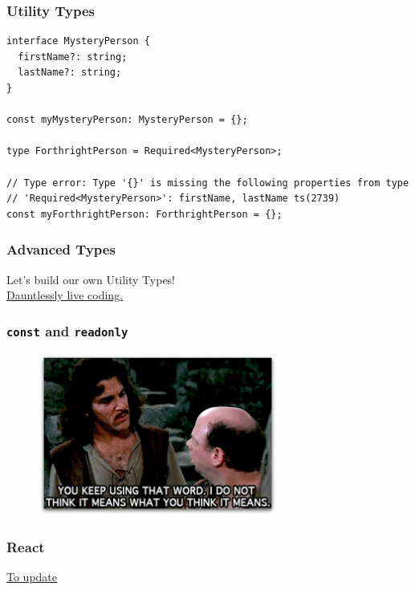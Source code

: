 \documentclass[aspectratio=169]{beamer}
\begin{document}
\begin{frame}[fragile]
  \frametitle{Utility Types}

  \begin{verbatim}
interface MysteryPerson {
  firstName?: string;
  lastName?: string;
}

const myMysteryPerson: MysteryPerson = {};

type ForthrightPerson = Required<MysteryPerson>;

// Type error: Type '{}' is missing the following properties from type
// 'Required<MysteryPerson>': firstName, lastName ts(2739)
const myForthrightPerson: ForthrightPerson = {};
  \end{verbatim}
\end{frame}

\begin{frame}[fragile]
  \frametitle{Advanced Types}

  Let's build our own Utility Types! \\

  \href{https://bit.ly/3a5OVs1}{Dauntlessly live coding.}
\end{frame}

\begin{frame}[fragile]
  \frametitle{\texttt{const} and \texttt{readonly}}
  \begin{figure}
    \href{https://bit.ly/32dLNpz}{\includegraphics[width=0.7\textwidth]{using_that_word.jpg}}
  \end{figure}
\end{frame}

\begin{frame}
  \frametitle{React}

  \href{https://codesandbox.io/s/exciting-pond-9t0zh}{To update} \\
\end{frame}
\end{document}
